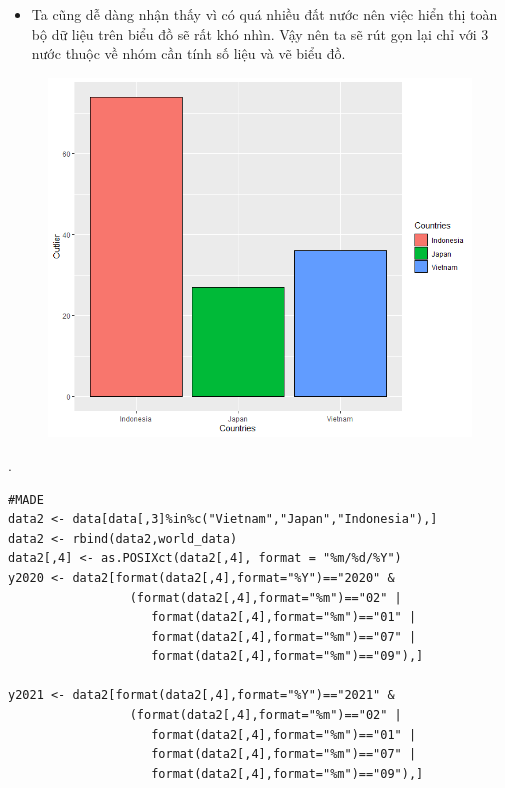 \documentclass[a4paper]{article}
\theoremstyle{definition}
\begin{document}
\begin{enumerate}[i)]
\begin{enumerate}[1)]
\begin{figure}[h!]
\begin{center}
	\end{center}
\end{figure}
\begin{itemize}
    \item Ta cũng dễ dàng nhận thấy vì có quá nhiều đất nước nên việc hiển thị toàn bộ dữ liệu trên biểu đồ sẽ rất khó nhìn. Vậy nên ta sẽ rút gọn lại chỉ với 3 nước thuộc về nhóm cần tính số liệu và vẽ biểu đồ.
\end{itemize}
\begin{figure}[h!]
	\begin{center}
        \includegraphics[scale=0.7]{Images/IV/iv (6) - 2.png}
	\end{center}
\end{figure}.

\end{enumerate}
\lstset{
    title=Function and data for v vi vii viii}
\begin{lstlisting}[frame = single]
#MADE
data2 <- data[data[,3]%in%c("Vietnam","Japan","Indonesia"),]
data2 <- rbind(data2,world_data)
data2[,4] <- as.POSIXct(data2[,4], format = "%m/%d/%Y")
y2020 <- data2[format(data2[,4],format="%Y")=="2020" & 
                 (format(data2[,4],format="%m")=="02" | 
                    format(data2[,4],format="%m")=="01" | 
                    format(data2[,4],format="%m")=="07" | 
                    format(data2[,4],format="%m")=="09"),]

y2021 <- data2[format(data2[,4],format="%Y")=="2021" & 
                 (format(data2[,4],format="%m")=="02" | 
                    format(data2[,4],format="%m")=="01" | 
                    format(data2[,4],format="%m")=="07" | 
                    format(data2[,4],format="%m")=="09"),]


\end{lstlisting}
\end{enumerate}
\end{document}
